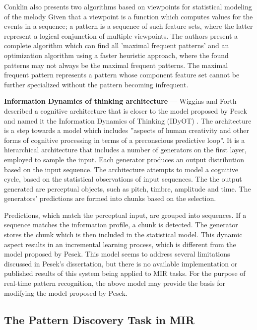 \documentclass[../main.tex]{subfiles}
\begin{document}
Conklin also presents two algorithms based on viewpoints for statistical modeling of the melody \cite{Conklin:1} Given that a viewpoint is a function which computes values for the events in a sequence; a pattern is a sequence of such feature sets, where the latter represent a logical conjunction of multiple viewpoints. The authors present a complete algorithm which can find all ’maximal frequent patterns’ and an optimization algorithm using a faster heuristic approach, where the found patterns may not always be the maximal frequent patterns. The maximal frequent pattern represents a pattern whose component feature set cannot be further specialized without the pattern becoming infrequent.

\textbf{Information Dynamics of thinking architecture} — Wiggins and Forth described a cognitive architecture that is closer to the model proposed by Pesek and named it the Information Dynamics of Thinking (IDyOT) \cite{Wiggins:1}. The architecture is a step towards a model which includes ”aspects of human creativity and other forms of cognitive processing in terms of a preconscious predictive loop”. It is a hierarchical architecture that includes a number of generators on the first layer, employed to sample the input. Each generator produces an output distribution based on the input sequence. The architecture attempts to model a cognitive cycle, based on the statistical observations of input sequences. The the output generated are perceptual objects, such as pitch, timbre, amplitude and time. The generators’ predictions are formed into chunks based on the selection.

Predictions, which match the perceptual input, are grouped into sequences. If a sequence matches the information profile, a chunk is detected. The generator stores the chunk which is then included in the statistical model. This dynamic aspect results in an incremental learning process, which is different from the model proposed by Pesek. This model seems to address several limitations discussed in Pesek's dissertation, but there is no available implementation or published results of this system being applied to MIR tasks. For the purpose of real-time pattern recognition, the above model may provide the basis for modifying the model proposed by Pesek. 

\subsection{The Pattern Discovery Task in MIR}
\end{document}
